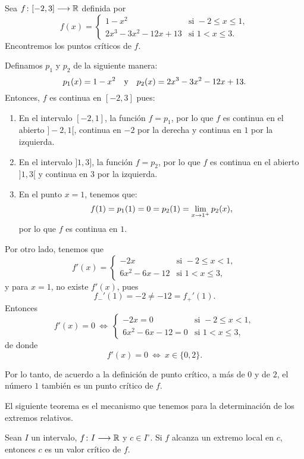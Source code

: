 \begin{exemplo}[]{}
Sea $\funcjc{f}{[-2,3]}{\Rbb}$ definida por
\[
f(x) =
\begin{cases}
1 - x^2 & \text{si } -2 \leq x \leq 1, \\
2x^3 - 3x^2 - 12x + 13 & \text{si } 1 < x \leq 3.
\end{cases}
\]
Encontremos los puntos críticos de $f$.

Definamos $p_1$ y $p_2$ de la siguiente manera:
\[
p_1(x) = 1 - x^2 \yjc p_2(x) = 2x^3 - 3x^2 - 12x + 13.
\]
Entonces, $f$ es continua en $[-2,3]$ pues:
\begin{enumerate}[leftmargin=*,listparindent=\parindent]
\item En el intervalo $[-2,1]$, la función $f = p_1$, por lo que $f$ es continua en el abierto
    $]-2,1[$, continua en $-2$ por la derecha y continua en $1$ por la izquierda.

\item En el intervalo $]1,3]$, la función $f = p_2$, por lo que $f$ es continua en el abierto
    $]1,3[$ y continua en $3$ por la izquierda.

\item En el punto $x = 1$, tenemos que:
    \[
      f(1) = p_1(1) = 0 = p_2(1) = \limjc{p_2(x)}{x}{1^+},
    \]
    por lo que $f$ es continua en $1$.
\end{enumerate}

Por otro lado, tenemos que
\[
f'(x) =
\begin{cases}
-2x & \text{si } -2 \leq x < 1, \\
6x^2 - 6x - 12 & \text{si } 1 < x \leq 3,
\end{cases}
\]
y para $x = 1$, no existe $f'(x)$, pues
\[
 f_-'(1) = -2 \neq -12 = f_+'(1).
\]
Entonces
\[
f'(x) = 0 \ \Longleftrightarrow \
\begin{cases}
-2x = 0 & \text{si } -2 \leq x < 1, \\
6x^2 - 6x - 12 = 0 & \text{si } 1 < x \leq 3,
\end{cases}
\]
de donde
\[
f'(x) = 0 \ \Longleftrightarrow \
x \in\{0,2\}.
\]

Por lo tanto, de acuerdo a la definición de punto crítico, a más de $0$ y de $2$, el número $1$
también es un punto crítico de $f$.
\end{exemplo}

El siguiente teorema es el mecanismo que tenemos para la determinación de los extremos relativos.

\begin{teocal}[Extremos locales]\label{teo:daExtremosLocalesPuntosCriticos}
Sean $I$ un intervalo, $\funcjc{f}{I}{\Rbb}$ y $c\in I^\circ$. Si $f$ alcanza un extremo local en
$c$, entonces $c$ es un valor crítico de $f$.
\end{teocal}

